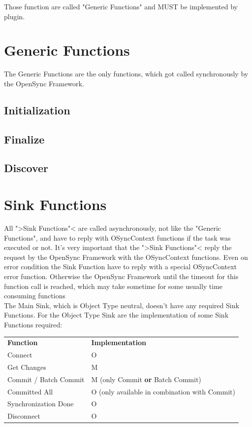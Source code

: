 Those function are called "Generic Functions" and MUST be implemented by 
plugin.

\section{Generic Functions}
The Generic Functions are the only functions, which got called synchronously by 
the OpenSync Framework.
\subsection{Initialization}
\subsection{Finalize}
\subsection{Discover}
\section{Sink Functions}
All ">Sink Functions"< are called asynchronously, not like the "Generic
Functions", and have to reply with OSyncContext functions if the task was 
executed or not. It's very important that the ">Sink Functions"< reply the
request by the OpenSync Framework with the OSyncContext functions. Even on
error condition the Sink Function have to reply with a special OSyncContext
error function. Otherwise the OpenSync Framework until the timeout for this
function call is reached, which may take sometime for some usually time 
consuming functions\\
The Main Sink, which is Object Type neutral, doesn't have any required Sink 
Functions. For the Object Type Sink are the implementation of some Sink 
Functions required:

\begin{center}
\begin{tabular}{ll}
\textbf{Function} & \textbf{Implementation} \\ 
Connect & O \\ 
Get Changes & M \\ 
Commit / Batch Commit & M (only Commit \textbf{or} Batch Commit) \\ 
Committed All & O (only available in combination with Commit)\\ 
Synchronization Done & O \\ 
Disconnect & O
\end{tabular}
\end{center}

